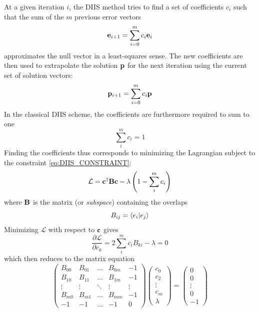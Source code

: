 At a given iteration $i$, the DIIS method tries to find a set of coefficients $c_i$ such that the sum of the $m$ previous error vectors 
\begin{equation}
\mathbf{e}_{i+1} = \sum_{i=0}^m c_i \mathbf{e}_i
\end{equation}
\noindent approximates the null vector in a least-squares sense. The new coefficients are then used to extrapolate the solution $\mathbf{p}$ for the next iteration using the current set of solution vectors:
\begin{equation}
\mathbf{p}_{i+1} = \sum_{i=0}^m c_i \mathbf{p}
\end{equation} 
\noindent In the classical DIIS scheme, the coefficients are furthermore required to sum to one 
\begin{equation}
\sum_i^m c_i = 1
\label{eq:DIIS_CONSTRAINT}
\end{equation}
\noindent Finding the coefficients thus corresponds to minimizing the Lagrangian subject to the constraint \ref{eq:DIIS_CONSTRAINT}:
\begin{equation}
\mathcal{L} = \mathbf{c}^{\dagger} \mathbf{B} \mathbf{c} - \lambda \left( 1 - \sum_i^m c_i \right)
\end{equation}
\noindent where $\mathbf{B}$ is the matrix (or \emph{subspace})
containing the overlaps
\begin{equation}
B_{ij} = \bra{\smash{e_i}}\ket{\smash{e_j}}
\end{equation}
\noindent Minimizing $\mathcal{L}$ with respect to $\mathbf{c}$ gives
\begin{equation}
\frac{\partial \mathcal{L}}{\partial c_k} = 2 \sum_i^m c_i B_{ki} - \lambda = 0
\end{equation}
\noindent which then reduces to the matrix equation
\begin{equation}
\begin{pmatrix}
B_{00} & B_{01} & \ldots & B_{0m} & -1 \\
B_{10} & B_{11} & \ldots & B_{1m} & -1 \\
\vdots & \vdots & \ddots & \vdots & \vdots \\
B_{m0} & B_{m1} & \ldots & B_{mm} & -1 \\
-1 & -1 & \ldots & -1 & 0
\end{pmatrix}
\begin{pmatrix}
c_0 \\
c_2 \\
\vdots \\
c_m \\
\lambda 
\end{pmatrix}
=
\begin{pmatrix}
0 \\ 0 \\ \vdots \\ 0 \\ -1
\end{pmatrix}
\end{equation}
